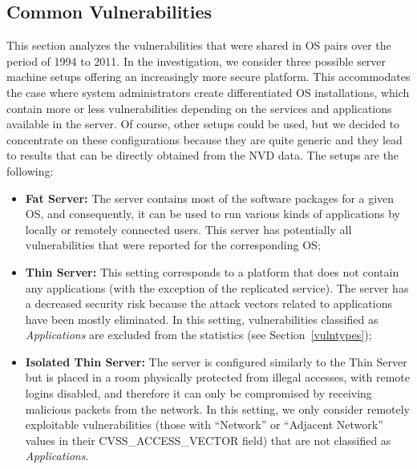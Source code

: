 \subsection{Common Vulnerabilities}\label{common_vulns}

This section analyzes the vulnerabilities that were shared in OS pairs over the period of 1994 to 2011. In the investigation, we consider three possible server machine setups offering an increasingly more secure platform. This accommodates the case where system administrators create differentiated OS installations, which contain more or less vulnerabilities depending on the services and applications available in the server. Of course, other setups could be used, but we decided to concentrate on these configurations because they are quite generic and they lead to results that can be directly obtained from the NVD data. The setups are the following:

\begin{itemize}

\item \textbf{Fat Server:} The server contains most of the software packages for a given OS, and consequently, it can be used to run various kinds of applications by locally or remotely connected users. This server has potentially all vulnerabilities that were reported for the corresponding OS;

\item \textbf{Thin Server:} This setting corresponds to a platform that does not contain any applications (with the exception of the replicated service). The server has a decreased security risk because the attack vectors related to applications have been mostly eliminated. In this setting, vulnerabilities classified as \textit{Applications} are excluded from the statistics (see Section~\ref{vulntypes});

\item \textbf{Isolated Thin Server:} The server is configured similarly to the Thin Server but is placed in a room physically protected from illegal accesses, with remote logins disabled, and therefore it can only be compromised by receiving malicious packets from the network. In this setting, we only consider remotely exploitable vulnerabilities (those with ``Network'' or ``Adjacent Network'' values in their CVSS\_ACCESS\_VECTOR field) that are not classified as \textit{Applications}.

\end{itemize}

